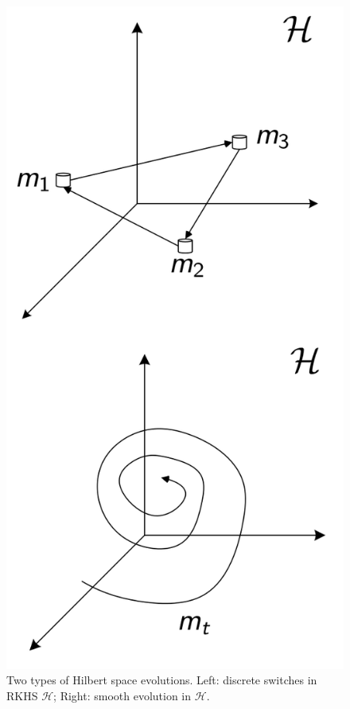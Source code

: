 \documentclass[letterpaper,12pt,peerreviewca,draftcls]{IEEEtran}
\newcommand{\fspace}{\mathcal{H}}
\begin{document}
\begin{figure}
	\centering
	\includegraphics[width=0.4\columnwidth]{"Figure 3"}
	\caption{Two types of Hilbert space evolutions. Left: discrete switches in RKHS $\fspace$; Right: smooth evolution in $\fspace$.}
	\label{fig:hilbert_evolution}           
\end{figure}\hfill
\end{document}
